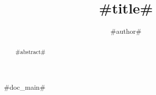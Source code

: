 \documentclass[times]{weauth}
\begin{document}
\title{#title#}
\author{#author#}
\address{#address#}

\begin{abstract}
#abstract#
\end{abstract}

\maketitle

#doc_main#
\end{document}
